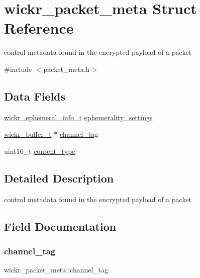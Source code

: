 \hypertarget{structwickr__packet__meta}{}\section{wickr\+\_\+packet\+\_\+meta Struct Reference}
\label{structwickr__packet__meta}


control metadata found in the encrypted payload of a packet  




{\ttfamily \#include $<$packet\+\_\+meta.\+h$>$}

\subsection*{Data Fields}
\begin{DoxyCompactItemize}
\item 
\mbox{\hyperlink{structwickr__ephemeral__info}{wickr\+\_\+ephemeral\+\_\+info\+\_\+t}} \mbox{\hyperlink{structwickr__packet__meta_a0ef43c179038ba036fc9db17976b8b1e}{ephemerality\+\_\+settings}}
\item 
\mbox{\hyperlink{structwickr__buffer}{wickr\+\_\+buffer\+\_\+t}} $\ast$ \mbox{\hyperlink{structwickr__packet__meta_ab160a2ecfc6146ddf2ce40fe301c8ce9}{channel\+\_\+tag}}
\item 
uint16\+\_\+t \mbox{\hyperlink{structwickr__packet__meta_ada659f7c31d257c76edab5db52973f6e}{content\+\_\+type}}
\end{DoxyCompactItemize}


\subsection{Detailed Description}
control metadata found in the encrypted payload of a packet 

\subsection{Field Documentation}
\mbox{\label{structwickr__packet__meta_ab160a2ecfc6146ddf2ce40fe301c8ce9}} 
\subsubsection{\texorpdfstring{channel\_tag}{channel\_tag}}
{\footnotesize\ttfamily wickr\+\_\+packet\+\_\+meta\+::channel\+\_\+tag}

